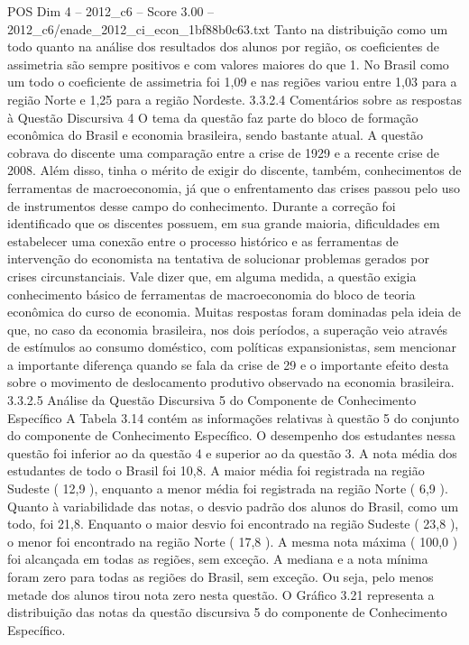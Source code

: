 \begin{textsample}{POS Dim 4 – 2012\_c6 – Score 3.00 – 2012\_c6/enade\_2012\_ci\_econ\_1bf88b0c63.txt}
Tanto na distribuição como um todo quanto na análise dos resultados dos alunos por região, os coeficientes de assimetria são sempre positivos e com valores maiores do que 1.
No Brasil como um todo o coeficiente de assimetria foi 1,09 e nas regiões variou entre 1,03 para a região Norte e 1,25 para a região Nordeste. 3.3.2.4 Comentários sobre as respostas à Questão Discursiva 4 O tema da questão faz parte do bloco de formação econômica do Brasil e economia brasileira, sendo bastante atual.
A questão cobrava do discente uma comparação entre a crise de 1929 e a recente crise de 2008.
Além disso, tinha o mérito de exigir do discente, também, conhecimentos de ferramentas de macroeconomia, já que o enfrentamento das crises passou pelo uso de instrumentos desse campo do conhecimento.
Durante a correção foi identificado que os discentes possuem, em sua grande maioria, dificuldades em estabelecer uma conexão entre o processo histórico e as ferramentas de intervenção do economista na tentativa de solucionar problemas gerados por crises circunstanciais.
Vale dizer que, em alguma medida, a questão exigia conhecimento básico de ferramentas de macroeconomia do bloco de teoria econômica do curso de economia.
Muitas respostas foram dominadas pela ideia de que, no caso da economia brasileira, nos dois períodos, a superação veio através de estímulos ao consumo doméstico, com políticas expansionistas, sem mencionar a importante diferença quando se fala da crise de 29 e o importante efeito desta sobre o movimento de deslocamento produtivo observado na economia brasileira. 3.3.2.5 Análise da Questão Discursiva 5 do Componente de Conhecimento Específico A Tabela 3.14 contém as informações relativas à questão 5 do conjunto do componente de Conhecimento Específico.
O desempenho dos estudantes nessa questão foi inferior ao da questão 4 e superior ao da questão 3.
A nota média dos estudantes de todo o Brasil foi 10,8.
A maior média foi registrada na região Sudeste ( 12,9 ), enquanto a menor média foi registrada na região Norte ( 6,9 ).
Quanto à variabilidade das notas, o desvio padrão dos alunos do Brasil, como um todo, foi 21,8.
Enquanto o maior desvio foi encontrado na região Sudeste ( 23,8 ), o menor foi encontrado na região Norte ( 17,8 ).
A mesma nota máxima ( 100,0 ) foi alcançada em todas as regiões, sem exceção.
A mediana e a nota mínima foram zero para todas as regiões do Brasil, sem exceção.
Ou seja, pelo menos metade dos alunos tirou nota zero nesta questão.
O Gráfico 3.21 representa a distribuição das notas da questão discursiva 5 do componente de Conhecimento Específico.

\end{textsample}
